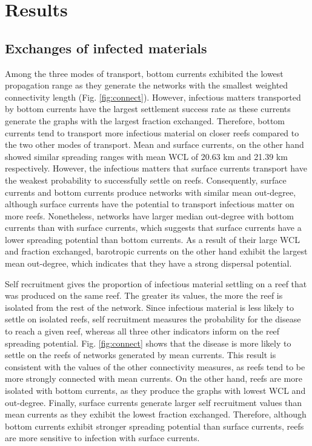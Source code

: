 \documentclass[utf8]{frontiersSCNS}
\begin{document}
\section{Results}

\subsection{Exchanges of infected materials}

Among the three modes of transport, bottom currents exhibited the lowest propagation range as they generate the networks with the smallest weighted connectivity length (Fig. \ref{fig:connect}). However, infectious matters transported by bottom currents have the largest settlement success rate as these currents generate the graphs with the largest fraction exchanged. Therefore, bottom currents tend to transport more infectious material on closer reefs compared to the two other modes of transport. Mean and surface currents, on the other hand showed similar spreading ranges with mean WCL of 20.63 km and 21.39 km respectively. However, the infectious matters that surface currents transport have the weakest probability to successfully settle on reefs. Consequently, surface currents and bottom currents produce networks with similar mean out-degree, although surface currents have the potential to transport infectious matter on more reefs. Nonetheless, networks have larger median out-degree with bottom currents than with surface currents, which suggests that surface currents have a lower spreading potential than bottom currents. As a result of their large WCL and fraction exchanged, barotropic currents on the other hand exhibit the largest mean out-degree, which indicates that they have a strong dispersal potential. 

Self recruitment gives the proportion of infectious material settling on a reef that was produced on the same reef. The greater its values, the more the reef is isolated from the rest of the network. Since infectious material is less likely to settle on isolated reefs, self recruitment measures the probability for the disease to reach a given reef, whereas all three other indicators inform on the reef spreading potential. Fig. \ref{fig:connect} shows that the disease is more likely to settle on the reefs of networks generated by mean currents. This result is consistent with the values of the other connectivity measures, as reefs tend to be more strongly connected with mean currents. On the other hand, reefs are more isolated with bottom currents, as they produce the graphs with lowest WCL and out-degree. Finally, surface currents generate larger self recruitment values than mean currents as they exhibit the lowest fraction exchanged. Therefore, although bottom currents exhibit stronger spreading potential than surface currents, reefs are more sensitive to infection with surface currents.
\end{document}
